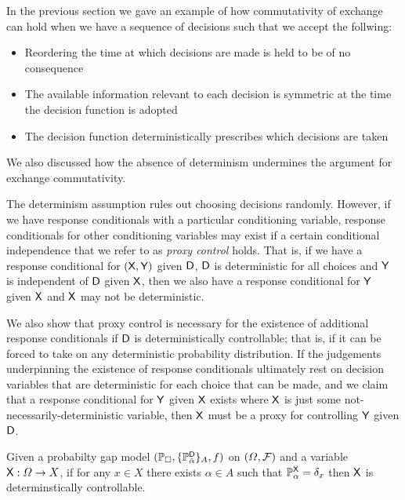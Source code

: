 In the previous section we gave an example of how commutativity of exchange can hold when we have a sequence of decisions such that we accept the follwing:

\begin{itemize}
    \item Reordering the time at which decisions are made is held to be of no consequence
    \item The available information relevant to each decision is symmetric at the time the decision function is adopted
    \item The decision function deterministically prescribes which decisions are taken
\end{itemize}

We also discussed how the absence of determinism undermines the argument for exchange commutativity.

The determinism assumption rules out choosing decisions randomly. However, if we have response conditionals with a particular conditioning variable, response conditionals for other conditioning variables may exist if a certain conditional independence that we refer to as \emph{proxy control} holds. That is, if we have a response conditional for $(\mathsf{X},\mathsf{Y})$ given $\mathsf{D}$, $\mathsf{D}$ is deterministic for all choices and $\mathsf{Y}$ is independent of $\mathsf{D}$ given $\mathsf{X}$, then we also have a response conditional for $\mathsf{Y}$ given $\mathsf{X}$ and $\mathsf{X}$ may not be deterministic.

We also show that proxy control is necessary for the existence of additional response conditionals if $\mathsf{D}$ is deterministically controllable; that is, if it can be forced to take on any deterministic probability distribution. If the judgements underpinning the existence of response conditionals ultimately rest on decision variables that are deterministic for each choice that can be made, and we claim that a response conditional for $\mathsf{Y}$ given $\mathsf{X}$ exists where $\mathsf{X}$ is just some not-necessarily-deterministic variable, then $\mathsf{X}$ must be a proxy for controlling $\mathsf{Y}$ given $\mathsf{D}$.

\begin{definition}
Given a probabilty gap model $(\mathbb{P}_\square,\{\mathbb{P}_{\tilde{\alpha}}^{\mathsf{D}}\}_A,f)$ on $(\Omega,\mathcal{F})$ and a variable $\mathsf{X}:\Omega\to X$, if for any $x\in X$ there exists $\alpha\in A$ such that $\mathbb{P}_\alpha^{\mathsf{X}}=\delta_x$ then $\mathsf{X}$ is determinstically controllable.
\end{definition}

